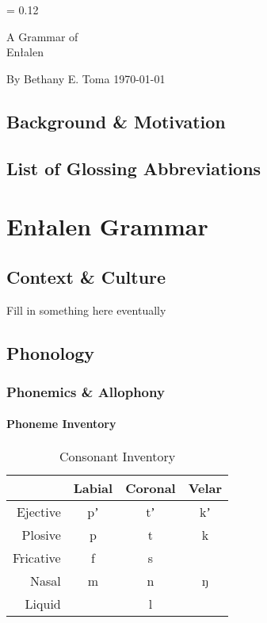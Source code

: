 \documentclass[a4paper,11pt,oneside,openany]{memoir}
\newlength{\drop}%
\newcommand*{\titleP}{\begingroup%
\drop = 0.12\textheight
\vspace*{\drop}
\begin{center}
{\huge A Grammar of}\\[\baselineskip]
{\HUGE\sc \parentlang}\par
\end{center}
\vspace*{3\drop}
{\large By {\sc Bethany E. Toma}}
\vfill
{\today}
\vspace*{0.5\drop}
\endgroup}
\newcommand{\parentlang}{Enłalen}
\begin{document}
\begin{titlingpage}
\titleP
\end{titlingpage}
\frontmatter

\chapter{Background \& Motivation}
\clearpage
\tableofcontents

\chapter{List of Glossing Abbreviations}

\mainmatter

\part{\parentlang{} Grammar}

\chapter{Context \& Culture}

Fill in something here eventually

\chapter{Phonology}

\section{Phonemics \& Allophony}

\subsection{Phoneme Inventory}

\begin{table}[h]
    \centering
    \begin{tabular}{@{}rccc@{}}
    \toprule
     & Labial & Coronal & Velar \\ \midrule
    Ejective & pʼ & tʼ & kʼ \\
    Plosive & p & t & k \\
    Fricative & f & s & \\
    Nasal & m & n & ŋ \\
    Liquid &  & l & \\ \bottomrule
    \end{tabular}
    \caption{Consonant Inventory}
    \label{tab:enl-consonants}
\end{table}
\end{document}
